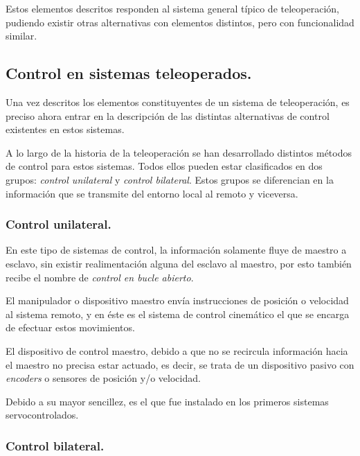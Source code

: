 Estos elementos descritos responden al sistema general típico de teleoperación, pudiendo existir otras alternativas con elementos distintos, pero con funcionalidad similar. \par 

\subsection{Control en sistemas teleoperados.}

Una vez descritos los elementos constituyentes de un sistema de teleoperación, es preciso ahora entrar en la descripción de las distintas alternativas de control existentes en estos sistemas. \par 

A lo largo de la historia de la teleoperación se han desarrollado distintos métodos de control para estos sistemas. Todos ellos pueden estar clasificados en dos grupos: \emph{control unilateral} y \emph{control bilateral}. Estos grupos se diferencian en la información que se transmite del entorno local al remoto y viceversa. \par 

\subsubsection{Control unilateral.}

En este tipo de sistemas de control, la información solamente fluye de maestro a esclavo, sin existir realimentación alguna del esclavo al maestro, por esto también recibe el nombre de \emph{control en bucle abierto}. \par 

El manipulador o dispositivo maestro envía instrucciones de posición o velocidad al sistema remoto, y en éste es el sistema de control cinemático el que se encarga de efectuar estos movimientos. \par 

El dispositivo de control maestro, debido a que no se recircula información hacia el maestro no precisa estar actuado, es decir, se trata de un dispositivo pasivo con \emph{encoders} o sensores de posición y/o velocidad. \par 

Debido a su mayor sencillez, es el que fue instalado en los primeros sistemas servocontrolados. \par 

\subsubsection{Control bilateral.}

